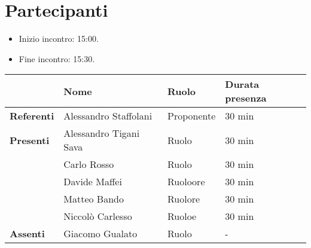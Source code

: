 \section*{Partecipanti}

\begin{itemize}
	\item Inizio incontro: 15:00.
	\item Fine incontro: 15:30.
\end{itemize}


\begin{center}
	{\renewcommand{\arraystretch}{1.5}
		\begin{tabular}{l|lll}
			                   & \textbf{Nome}          & \textbf{Ruolo} & \textbf{Durata presenza} \\
			\hline
			\textbf{Referenti} & Alessandro Staffolani  & Proponente     & 30 min                   \\
			\hline
			\textbf{Presenti}  & Alessandro Tigani Sava & Ruolo          & 30 min                   \\
			                   & Carlo Rosso            & Ruolo          & 30 min                   \\
			                   & Davide Maffei          & Ruoloore       & 30 min                   \\
			                   & Matteo Bando           & Ruolore        & 30 min                   \\
			                   & Niccolò Carlesso       & Ruoloe         & 30 min                   \\
			\hline
			\textbf{Assenti}   & Giacomo Gualato        & Ruolo          & -                        \\
		\end{tabular}
	}
\end{center}

